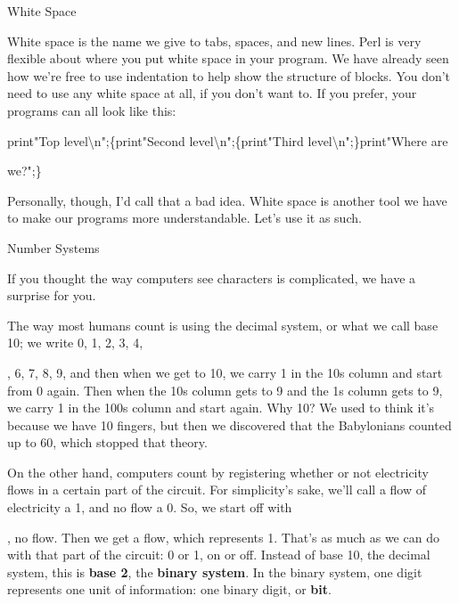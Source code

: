 \documentclass[a4paper,11pt]{book}
\begin{document}
\noindent 

\noindent White Space

\noindent 

\noindent White space is the name we give to tabs, spaces, and new lines. Perl is very flexible about where you put white space in your program. We have already seen how we're free to use indentation to help show the structure of blocks. You don't need to use any white space at all, if you don't want to. If you prefer, your programs can all look like this:

\noindent 

\noindent 

\noindent print"Top level\textbackslash n";\{print"Second level\textbackslash n";\{print"Third level\textbackslash n";\}print"Where are

\noindent we?";\}

\noindent 

\noindent Personally, though, I'd call that a bad idea. White space is another tool we have to make our programs more understandable. Let's use it as such.

\noindent 

\noindent 

\noindent Number Systems

\noindent 

\noindent If you thought the way computers see characters is complicated, we have a surprise for you.

\noindent 

\noindent The way most humans count is using the decimal system, or what we call base 10; we write 0, 1, 2, 3, 4,

, 6, 7, 8, 9, and then when we get to 10, we carry 1 in the 10s column and start from 0 again. Then when the 10s column gets to 9 and the 1s column gets to 9, we carry 1 in the 100s column and start again. Why 10? We used to think it's because we have 10 fingers, but then we discovered that the Babylonians counted up to 60, which stopped that theory.

\noindent 

\noindent On the other hand, computers count by registering whether or not electricity flows in a certain part of the circuit. For simplicity's sake, we'll call a flow of electricity a 1, and no flow a 0. So, we start off with

, no flow. Then we get a flow, which represents 1. That's as much as we can do with that part of the circuit: 0 or 1, on or off. Instead of base 10, the decimal system, this is \textbf{base 2}, the \textbf{binary system}. In the binary system, one digit represents one unit of information: one binary digit, or \textbf{bit}.
\end{document}
